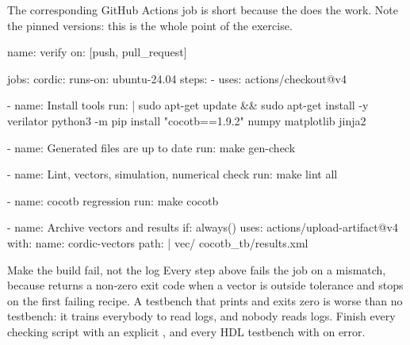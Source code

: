 
The corresponding GitHub Actions job is short because the 
does the work. Note the pinned versions: this is the whole point of the
exercise.

\begin{txtcode}
name: verify
on: [push, pull_request]

jobs:
  cordic:
    runs-on: ubuntu-24.04
    steps:
      - uses: actions/checkout@v4

      - name: Install tools
        run: |
          sudo apt-get update && sudo apt-get install -y verilator
          python3 -m pip install "cocotb==1.9.2" numpy matplotlib jinja2

      - name: Generated files are up to date
        run: make gen-check

      - name: Lint, vectors, simulation, numerical check
        run: make lint all

      - name: cocotb regression
        run: make cocotb

      - name: Archive vectors and results
        if: always()
        uses: actions/upload-artifact@v4
        with:
          name: cordic-vectors
          path: |
            vec/
            cocotb_tb/results.xml
\end{txtcode}

\begin{tipbox}{Make the build fail, not the log}
Every step above fails the job on a mismatch, because
 returns a non-zero exit code when a vector is
outside tolerance and \code{make} stops on the first failing recipe. A
testbench that prints \code{FAIL} and exits zero is worse than no testbench:
it trains everybody to read logs, and nobody reads logs. Finish every
checking script with an explicit \code{sys.exit(1)}, and every HDL testbench
with \code{\$fatal} on error.
\end{tipbox}

